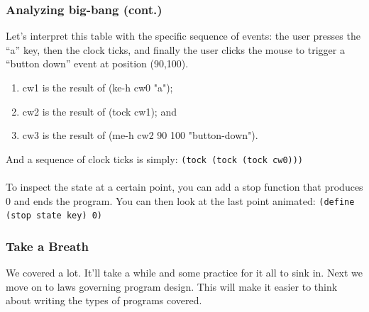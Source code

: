 \documentclass{beamer}
\begin{document}
\begin{frame}
  \frametitle{Analyzing big-bang (cont.)}
  Let’s interpret this table with the specific sequence of events: the user presses the “a” key, then the clock ticks, and finally the user clicks the mouse to trigger a “button down” event at position (90,100).
  \begin{enumerate}
  \item<2-> cw1 is the result of (ke-h cw0 "a");
  \item<3-> cw2 is the result of (tock cw1); and
  \item<4-> cw3 is the result of (me-h cw2 90 100 "button-down").
  \end{enumerate}
  \pause
  And a sequence of clock ticks is simply:
  \texttt{(tock (tock (tock cw0)))}
  \pause
  \\\\
  To inspect the state at a certain point, you can add a stop function that
  produces 0 and ends the program. You can then look at the last point animated:
  \texttt{(define (stop state key) 0)}
\end{frame}

\begin{frame}
  \frametitle{Take a Breath}
  \huge We covered a lot. It'll take a while and some practice  for it all to sink in. Next we move on to laws governing program design. This will make it easier
  to think about writing the types of programs covered.
\end{frame}
\end{document}
